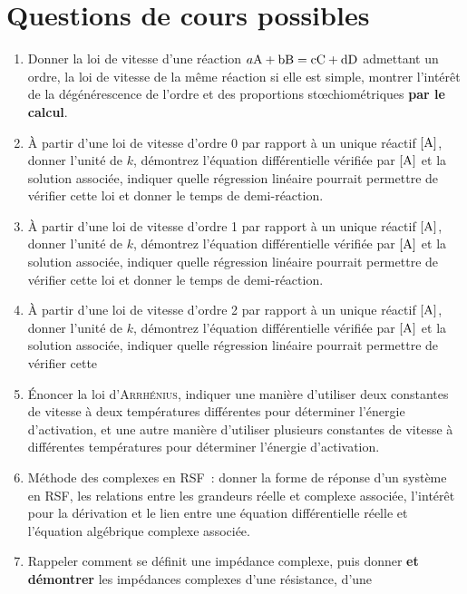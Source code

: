\documentclass[a4paper, 12pt, final, garamond]{book}
\begin{document}
\section{Questions de cours possibles}
\begin{enumerate}
    \item Donner la loi de vitesse d'une réaction $a\rm{A} + b\rm{B} = c\rm{C}
        + d\rm{D}$ admettant un ordre, la loi de vitesse de la même réaction si
        elle est simple, montrer l'intérêt de la dégénérescence de l'ordre et
        des proportions stœchiométriques \textbf{par le calcul}.
    \item À partir d'une loi de vitesse d'ordre 0 par rapport à un unique
        réactif $[{\rm A}]$, donner l'unité de $k$, démontrez l'équation
        différentielle vérifiée par $[{\rm A}]$ et la solution associée,
        indiquer quelle régression linéaire pourrait permettre de vérifier cette
        loi et donner le temps de demi-réaction.
    \item À partir d'une loi de vitesse d'ordre 1 par rapport à un unique
        réactif $[{\rm A}]$, donner l'unité de $k$, démontrez l'équation
        différentielle vérifiée par $[{\rm A}]$ et la solution associée,
        indiquer quelle régression linéaire pourrait permettre de vérifier cette
        loi et donner le temps de demi-réaction.
    \item À partir d'une loi de vitesse d'ordre 2 par rapport à un unique
        réactif $[{\rm A}]$, donner l'unité de $k$, démontrez l'équation
        différentielle vérifiée par $[{\rm A}]$ et la solution associée,
        indiquer quelle régression linéaire pourrait permettre de vérifier cette
    \item Énoncer la loi d'\textsc{Arrhénius}, indiquer une manière d'utiliser
        deux constantes de vitesse à deux températures différentes pour
        déterminer l'énergie d'activation, et une autre manière d'utiliser
        plusieurs constantes de vitesse à différentes températures pour
        déterminer l'énergie d'activation.
    \item Méthode des complexes en RSF~: donner la forme de réponse d'un système
        en RSF, les relations entre les grandeurs réelle et complexe associée,
        l'intérêt pour la dérivation et le lien entre une équation
        différentielle réelle et l'équation algébrique complexe associée.
    \item Rappeler comment se définit une impédance complexe, puis donner
        \textbf{et démontrer} les impédances complexes d'une résistance, d'une

\end{enumerate}
\end{document}
